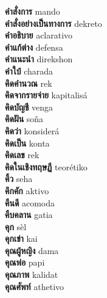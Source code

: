 \textbf{ คำสั่งการ  } mando \\
\textbf{ คำสั่งอย่างเป็นทางการ  } dekreto \\
\textbf{ คำอธิบาย  } aclarativo \\
\textbf{ คำแก้ต่าง  } defensa \\
\textbf{ คำแนะนำ  } direkshon \\
\textbf{ คำใบ้  } charada \\
\textbf{ คิดคำนวณ  } rek \\
\textbf{ คิดจากรายจ่าย  } kapitalisá \\
\textbf{ คิดบัญชี  } venga \\
\textbf{ คิดฝัน  } soña \\
\textbf{ คิดว่า  } konsiderá \\
\textbf{ คิดเป็น  } konta \\
\textbf{ คิดเลข  } rek \\
\textbf{ คิดในเชิงทฤษฏี  } teorétiko \\
\textbf{ คิ้ว  } seha \\
\textbf{ คึกคัก  } aktivo \\
\textbf{ คืนดี  } acomoda \\
\textbf{ คืบคลาน  } gatia \\
\textbf{ คุก  } sèl \\
\textbf{ คุกเข่า  } kai \\
\textbf{ คุณผู้หญิง  } dama \\
\textbf{ คุณพ่อ  } papi \\
\textbf{ คุณภาพ  } kalidat \\
\textbf{ คุณศัพท์  } athetivo \\
